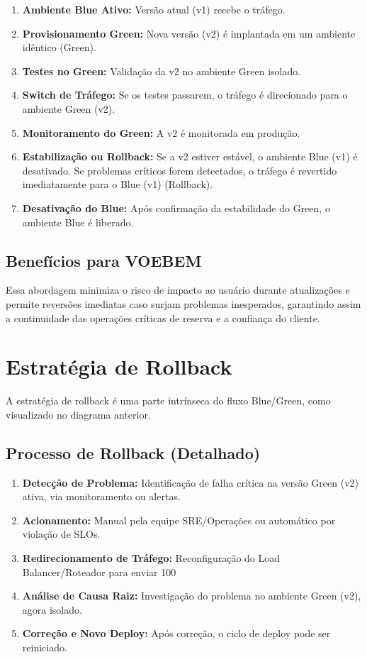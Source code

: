 \begin{enumerate}
    \item \textbf{Ambiente Blue Ativo:} Versão atual (v1) recebe o tráfego.
    \item \textbf{Provisionamento Green:} Nova versão (v2) é implantada em um ambiente idêntico (Green).
    \item \textbf{Testes no Green:} Validação da v2 no ambiente Green isolado.
    \item \textbf{Switch de Tráfego:} Se os testes passarem, o tráfego é direcionado para o ambiente Green (v2).
    \item \textbf{Monitoramento do Green:} A v2 é monitorada em produção.
    \item \textbf{Estabilização ou Rollback:} Se a v2 estiver estável, o ambiente Blue (v1) é desativado. Se problemas críticos forem detectados, o tráfego é revertido imediatamente para o Blue (v1) (Rollback).
    \item \textbf{Desativação do Blue:} Após confirmação da estabilidade do Green, o ambiente Blue é liberado.
\end{enumerate}

\subsection{Benefícios para VOEBEM}
\label{subsec:deploy-beneficios}
Essa abordagem minimiza o risco de impacto ao usuário durante atualizações e permite reversões imediatas caso surjam problemas inesperados, garantindo assim a continuidade das operações críticas de reserva e a confiança do cliente.

\section{Estratégia de Rollback}
\label{sec:estrategia-rollback}

A estratégia de rollback é uma parte intrínseca do fluxo Blue/Green, como visualizado no diagrama anterior.

\subsection{Processo de Rollback (Detalhado)}
\label{subsec:rollback-processo}
\begin{enumerate}
    \item \textbf{Detecção de Problema:} Identificação de falha crítica na versão Green (v2) ativa, via monitoramento ou alertas.
    \item \textbf{Acionamento:} Manual pela equipe SRE/Operações ou automático por violação de SLOs.
    \item \textbf{Redirecionamento de Tráfego:} Reconfiguração do Load Balancer/Roteador para enviar 100%
    \item \textbf{Análise de Causa Raiz:} Investigação do problema no ambiente Green (v2), agora isolado.
    \item \textbf{Correção e Novo Deploy:} Após correção, o ciclo de deploy pode ser reiniciado.
\end{enumerate}

